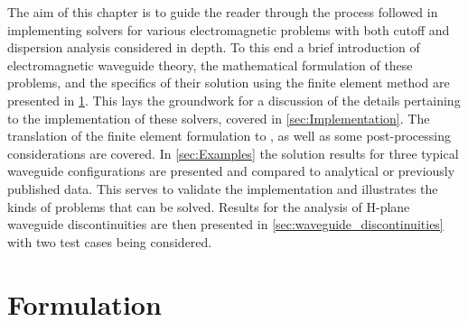 The aim of this chapter is to guide the reader through the process
followed in implementing solvers for various electromagnetic problems
with both cutoff and dispersion analysis considered in depth. To this
end a brief introduction of electromagnetic waveguide theory, the
mathematical formulation of these problems, and the specifics of their
solution using the finite element method are presented in
\ref{sec:formulation}. This lays the groundwork for a discussion of
the details pertaining to the \fenics{} implementation of these
solvers, covered in \ref{sec:Implementation}. The translation of the
finite element formulation to \fenics{}, as well as some
post-processing considerations are covered. In \ref{sec:Examples} the
solution results for three typical waveguide configurations are
presented and compared to analytical or previously published data.
This serves to validate the implementation and illustrates the kinds
of problems that can be solved. Results for the analysis of H-plane
waveguide discontinuities are then presented in
\ref{sec:waveguide_discontinuities} with two test cases being
considered.

\section{Formulation}
\label{sec:formulation}

